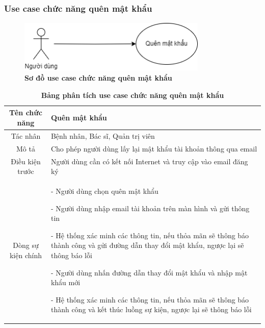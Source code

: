 \subsubsection{Use case chức năng quên mật khẩu}
  \begin{figure}[H]
    \centering
    \includegraphics[width=9cm,height=2.5cm]{Images/use_case/use_case_forgot_password.png}
    \caption[Sơ đồ use case chức năng quên mật khẩu]{\bfseries \fontsize{12pt}{0pt}
    \selectfont Sơ đồ use case chức năng quên mật khẩu}
    \label{use_case_forget_password} %
  \end{figure}

  \begin{table}[H]
    \caption{\bfseries \fontsize{12pt}{0pt}\selectfont Bảng phân tích use case chức năng quên mật khẩu}
    \centering
    \begin{tabularx}{0.9\textwidth}{|c|X|}
      \hline
      \textbf{Tên chức năng} & \textbf{Quên mật khẩu} \\
      \hline
      Tác nhân & Bệnh nhân, Bác sĩ, Quản trị viên \\
      \hline
      Mô tả & Cho phép người dùng lấy lại mật khẩu tài khoản thông qua email
       \\
      \hline
      Điều kiện trước & Người dùng cần có kết nối Internet và truy cập vào email đăng ký \\
      \hline
      Dòng sự kiện chính & 
        - Người dùng chọn quên mật khẩu

        - Người dùng nhập email tài khoản trên màn hình và gửi thông tin

        - Hệ thống xác minh các thông tin, nếu thỏa mãn sẽ thông báo thành công và gửi đường dẫn thay đổi mật khẩu, ngược lại 
        sẽ thông báo lỗi 

        - Người dùng nhấn đường dẫn thay đổi mật khẩu và nhập mật khẩu mới

        - Hệ thống xác minh các thông tin, nếu thỏa mãn sẽ thông báo thành công và kết thúc luồng sự kiện, ngược lại 
        sẽ thông báo lỗi 
        \\
      \hline
    \end{tabularx}
  \end{table}

